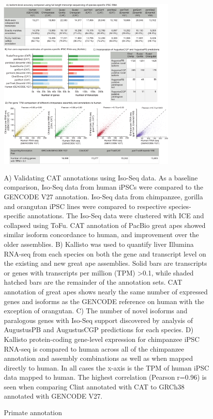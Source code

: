 \documentclass[fleqn,10pt]{wlscirep}
\begin{document}
\begin{figure}
\centering
\includegraphics[width=0.8\textwidth,height=0.8\textheight,keepaspectratio]{figure2-primate_v10.pdf}
\caption{Primate annotation}
A) Validating CAT annotations using Iso-Seq data. As a baseline comparison, Iso-Seq data from human iPSCs were compared to the GENCODE V27 annotation. Iso-Seq data from chimpanzee, gorilla and orangutan iPSC lines were compared to respective species-specific annotations. The Iso-Seq data were clustered with ICE and collapsed using ToFu\cite{gordon2015widespread}. CAT annotation of PacBio great apes showed similar isoform concordance to human, and improvement over the older assemblies. B) Kallisto\cite{bray2015near} was used to quantify liver Illumina RNA-seq from each species on both the gene and transcript level on the existing and new great ape assemblies. Solid bars are transcripts or genes with transcripts per million (TPM) \textgreater 0.1, while shaded hatched bars are the remainder of the annotation sets. CAT annotation of great apes shows nearly the same number of expressed genes and isoforms as the GENCODE reference on human with the exception of orangutan. C) The number of novel isoforms and paralogous genes with Iso-Seq support discovered by analysis of AugustusPB and AugustusCGP predictions for each species. D) Kallisto protein-coding gene-level expression for chimpanzee iPSC RNA-seq is compared to human across all of the chimpanzee annotation and assembly combinations as well as when mapped directly to human. In all cases the x-axis is the TPM of human iPSC data mapped to human. The highest correlation (Pearson r=0.96) is seen when comparing Clint annotated with CAT to GRCh38 annotated with GENCODE V27.
\label{fig:primate}
\end{figure}
\end{document}
